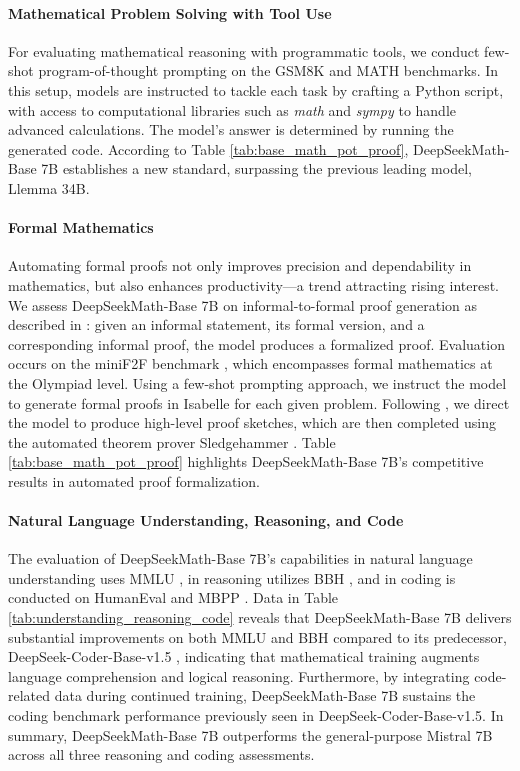 \paragraph{Mathematical Problem Solving with Tool Use} For evaluating mathematical reasoning with programmatic tools, we conduct few-shot program-of-thought prompting \citep{pot,pal} on the GSM8K and MATH benchmarks. In this setup, models are instructed to tackle each task by crafting a Python script, with access to computational libraries such as \textit{math} and \textit{sympy} to handle advanced calculations. The model’s answer is determined by running the generated code. According to Table \ref{tab:base_math_pot_proof}, DeepSeekMath-Base 7B establishes a new standard, surpassing the previous leading model, Llemma 34B.

\paragraph{Formal Mathematics}

Automating formal proofs not only improves precision and dependability in mathematics, but also enhances productivity—a trend attracting rising interest. We assess DeepSeekMath-Base 7B on informal-to-formal proof generation as described in \citep{dsp_proof}: given an informal statement, its formal version, and a corresponding informal proof, the model produces a formalized proof. Evaluation occurs on the miniF2F benchmark \citep{minif2f}, which encompasses formal mathematics at the Olympiad level. Using a few-shot prompting approach, we instruct the model to generate formal proofs in Isabelle for each given problem. Following \cite{dsp_proof}, we direct the model to produce high-level proof sketches, which are then completed using the automated theorem prover Sledgehammer \citep{sledgehammer}. Table \ref{tab:base_math_pot_proof} highlights DeepSeekMath-Base 7B’s competitive results in automated proof formalization.

\paragraph{Natural Language Understanding, Reasoning, and Code}

The evaluation of DeepSeekMath-Base 7B’s capabilities in natural language understanding uses MMLU \citep{mmlu}, in reasoning utilizes BBH \citep{bbh}, and in coding is conducted on HumanEval \citep{codex} and MBPP \citep{mbpp}. Data in Table \ref{tab:understanding_reasoning_code} reveals that DeepSeekMath-Base 7B delivers substantial improvements on both MMLU and BBH compared to its predecessor, DeepSeek-Coder-Base-v1.5 \citep{deepseek-coder}, indicating that mathematical training augments language comprehension and logical reasoning. Furthermore, by integrating code-related data during continued training, DeepSeekMath-Base 7B sustains the coding benchmark performance previously seen in DeepSeek-Coder-Base-v1.5. In summary, DeepSeekMath-Base 7B outperforms the general-purpose Mistral 7B \citep{mistral} across all three reasoning and coding assessments.

